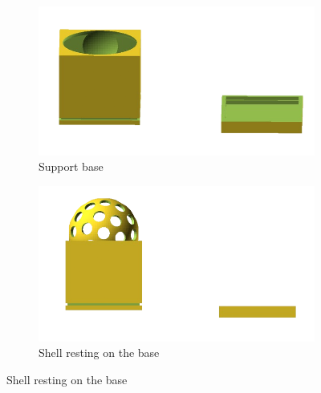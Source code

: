 \begin{figure}[H]
    \centering
    \begin{subfigure}[b]{0.4\linewidth}
        \includegraphics[width=\linewidth]{images/Supports.png}
        \caption{Support base}
    \end{subfigure}
    \begin{subfigure}[b]{0.4\linewidth}
        \includegraphics[width=\linewidth]{images/Jammer+Supports.png}
        \caption{Shell resting on the base}
    \end{subfigure}

\end{figure}
